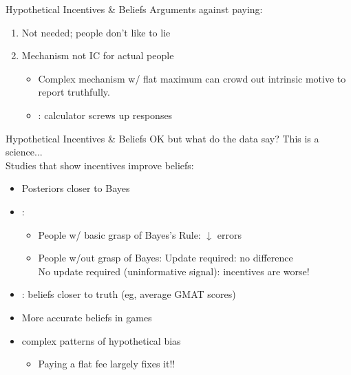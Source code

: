 \begin{frame}{Hypothetical Incentives \& Beliefs}
    Arguments against paying:
    \begin{enumerate}
        \item Not needed; people don't like to lie \citep{Gneezy2005,FischbacherFollmi-Heusi2013}
        \item Mechanism not IC for actual people
        \begin{itemize}
            \item Complex mechanism w/ flat maximum can crowd out intrinsic motive to report truthfully.
            \item \citet{DanzEtAl2022}: calculator screws up responses
        \end{itemize}
    \end{enumerate}
\end{frame}

\begin{frame}{Hypothetical Incentives \& Beliefs}
OK but what do the data say? This is a science...\\
Studies that show incentives improve beliefs:
\begin{itemize}
    \item Posteriors closer to Bayes \citep{PhillipsEdwards1966,Grether1980,WrightAnderson1989}
    \item \cite{BurfurdWilkening2022}: 
    \begin{itemize}
        \item People w/ basic grasp of Bayes's Rule: $\downarrow$ errors
        \item People w/out grasp of Bayes: Update required: no difference\\
        No update required (uninformative signal): incentives are worse!
    \end{itemize}
    \item \cite{WrightAboul-Ezz1988}: beliefs closer to truth (eg, average GMAT scores) 
    \item More accurate beliefs in games \citep{GachterRenner2010,Wang2011} 
    \item \cite{Harrison2014} complex patterns of hypothetical bias
    \begin{itemize}
        \item Paying a flat fee largely fixes it!!
    \end{itemize}
\end{itemize}
\end{frame}

